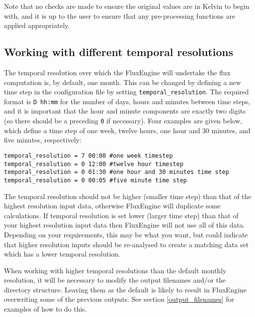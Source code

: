 \documentclass[]{scrartcl}
\begin{document}
{Note that no checks are made to ensure the original values are in Kelvin to begin with, and it is up to the user to ensure that any pre-processing functions are applied appropriately.

\subsection{Working with different temporal resolutions} \label{temporal_resolutions}
The temporal resolution over which the FluxEngine will undertake the flux computation is, by default, one month. This can be changed by defining a new time step in the configuration file by setting \texttt{temporal\_resolution}. The required format is \texttt{D hh:mm} for the number of days, hours and minutes between time steps, and it is important that the hour and minute components are exactly two digits (so there should be a preceding \texttt{0} if necessary). Four examples are given below, which define a time step of one week, twelve hours, one hour and 30 minutes, and five minutes, respectively:
\begin{lstlisting}
temporal_resolution = 7 00:00 #one week timestep
temporal_resolution = 0 12:00 #twelve hour timestep
temporal_resolution = 0 01:30 #one hour and 30 minutes time step
temporal_resolution = 0 00:05 #five minute time step
\end{lstlisting}

The temporal resolution should not be higher (smaller time step) than that of the highest resolution input data, otherwise FluxEngine will duplicate some calculations. If temporal resolution is set lower (larger time step) than that of your highest resolution input data then FluxEngine will not use all of this data. Depending on your requirements, this may be what you want, but could indicate that higher resolution inputs should be re-analysed to create a matching data set which has a lower temporal resolution.

When working with higher temporal resolutions than the default monthly resolution, it will be necessary to modify the output filenames and/or the directory structure. Leaving them as the default is likely to result in FluxEngine overwriting some of the previous outputs. See section \ref{output_filenames} for examples of how to do this.



}
\end{document}
